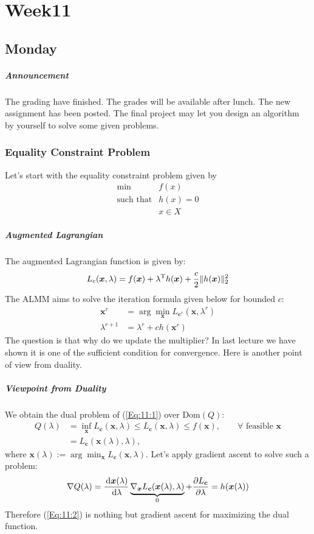 
\chapter{Week11}

\section{Monday}
\paragraph{Announcement}
The grading have finished. The grades will be available after lunch. The new assignment has been posted. The final project may let you design an algorithm by yourself to solve some given problems.
\subsection{Equality Constraint Problem}
Let's start with the equality constraint problem given by
\begin{equation}\label{Eq:11:1}
\begin{array}{ll}
\min&f(x)\\
\mbox{such that}&h(x)=0\\
&x\in X
\end{array}
\end{equation}
\paragraph{Augmented Lagrangian}
The augmented Lagrangian function is given by:
\[
L_c(\bm x,\lambda)=f(\bm x)+\lambda^{\mathrm T} h(\bm x)+\frac{c}{2}\|h(\bm x)\|_2^2
\]
The ALMM aims to solve the iteration formula given below for bounded $c$:
\begin{align}
\bm x^r&=\arg\min_{\bm x}L_{\bm c^r}(\bm x,\lambda^r)\\
\lambda^{r+1}&=\lambda^r+ch(\bm x^r)\label{Eq:11:2}
\end{align}
The question is that why do we update the multiplier? In last lecture we have shown it is one of the sufficient condition for convergence. Here is another point of view from duality.

\paragraph{Viewpoint from Duality}
We obtain the dual problem of (\ref{Eq:11:1}) over $\mbox{Dom}(Q)$:
\begin{align}
Q(\lambda)&=\inf_{\bm x}L_{\bm c}(\bm x,\lambda)\le L_{\bm c}(\bm x,\lambda)\le f(\bm x),\qquad\forall\mbox{ feasible }\bm x\\
&=L_{\bm c}(\bm x(\lambda),\lambda),
\end{align}
where $\bm x(\lambda):=\arg\min_{\bm x}L_{\bm c}(\bm x,\lambda)$. Let's apply gradient ascent to solve such a problem:
\[
\nabla Q(\lambda)=
\frac{\,\mathrm{d} \bm x(\lambda)}{\,\mathrm{d}\lambda}\underbrace{
\nabla_{\bm x}L_{\bm c}(\bm x(\lambda),\lambda)
}_{0}
+\frac{\partial L_{\bm c}}{\partial\lambda}=h(\bm x(\lambda))
\]
Therefore (\ref{Eq:11:2}) is nothing but gradient ascent for maximizing the dual function.

